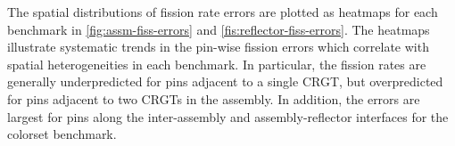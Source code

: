 The spatial distributions of fission rate errors are plotted as heatmaps for each benchmark in \autoref{fig:assm-fiss-errors} and \autoref{fis:reflector-fiss-errors}. The heatmaps illustrate systematic trends in the pin-wise fission errors which correlate with spatial heterogeneities in each benchmark. In particular, the fission rates are generally underpredicted for pins adjacent to a single CRGT, but overpredicted for pins adjacent to two CRGTs in the assembly. In addition, the errors are largest for pins along the inter-assembly and assembly-reflector interfaces for the colorset benchmark.


\clearpage

